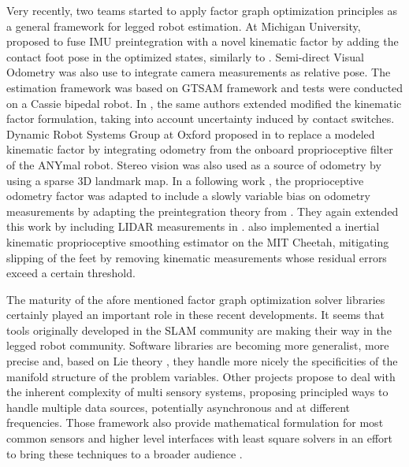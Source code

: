 Very recently, two teams started to apply factor graph optimization principles as a general framework for legged robot estimation. At Michigan University, \cite{hartley2018legged} 
proposed to fuse IMU preintegration with a novel kinematic factor by adding the contact foot pose in the optimized states, similarly to \cite{bloesch2013state,rotella2014state}. 
Semi-direct Visual Odometry \cite{forster2014svo} was also use to integrate camera measurements as relative pose. The estimation framework was based on GTSAM framework \cite{dellaert2012factor}
and tests were conducted on a Cassie bipedal robot. In \cite{hartley2018hybrid}, the same authors extended 
modified the kinematic factor formulation, taking into account uncertainty induced by contact switches. Dynamic Robot Systems Group at Oxford proposed in 
\cite{wisth2019robust} to replace a modeled kinematic factor by integrating odometry from the onboard proprioceptive filter of the ANYmal robot. Stereo vision was also used as a source of
odometry by using a sparse 3D landmark map. In a following work \cite{wisth2020preintegrated}, the proprioceptive odometry factor was adapted
to include a slowly variable bias on odometry measurements by adapting the preintegration theory from \cite{forster2017-TRO}. They again extended this work
by including LIDAR measurements in \cite{wisth2021vilens}.
\cite{kim2021legged} also implemented a inertial kinematic proprioceptive smoothing estimator on the MIT Cheetah, mitigating slipping of the feet by removing kinematic 
measurements whose residual errors exceed a certain threshold.    


The maturity of the afore mentioned factor graph optimization solver libraries certainly played an important role in these recent developments. It seems
that tools originally developed in the SLAM community are making their way in the legged robot community. Software libraries are becoming more
generalist, more precise and, based on Lie theory \cite{sola2018micro}, they handle more nicely the specificities of the manifold structure of the problem variables.
Other projects propose to deal with the inherent complexity of multi sensory systems, proposing principled ways to handle multiple data sources, potentially asynchronous and at
different frequencies. Those framework also provide mathematical formulation for most common sensors and higher level interfaces with least square solvers 
in an effort to bring these techniques to a broader audience \cite{sola2021wolf, blanco2019modular, colosi2020plug}.



